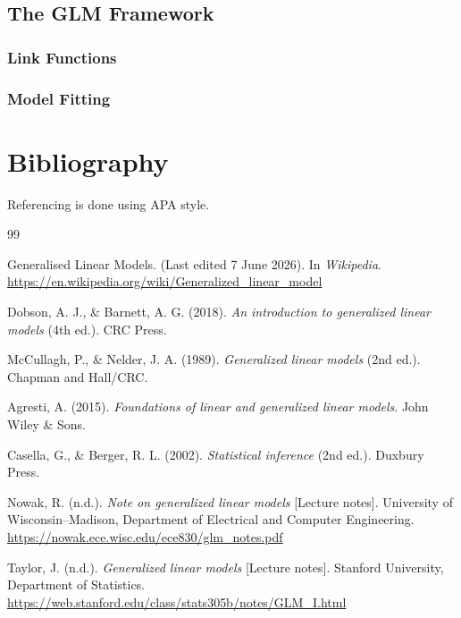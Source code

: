 \documentclass[12pt,a4paper]{report}
\begin{document}
\section{The GLM Framework}
\subsection{Link Functions}
\subsection{Model Fitting}

\chapter*{Bibliography}

Referencing is done using APA style.

\begin{thebibliography}{99}\setlength{\itemsep}{0.5em}

 Generalised Linear Models. (Last edited 7 June 2026). In \textit{Wikipedia}. \url{https://en.wikipedia.org/wiki/Generalized_linear_model}

 Dobson, A. J., \& Barnett, A. G. (2018). \textit{An introduction to generalized linear models} (4th ed.). CRC Press.

 McCullagh, P., \& Nelder, J. A. (1989). \textit{Generalized linear models} (2nd ed.). Chapman and Hall/CRC.

 Agresti, A. (2015). \textit{Foundations of linear and generalized linear models}. John Wiley \& Sons.

 Casella, G., \& Berger, R. L. (2002). \textit{Statistical inference} (2nd ed.). Duxbury Press.

 Nowak, R. (n.d.). \textit{Note on generalized linear models} [Lecture notes]. University of Wisconsin--Madison, Department of Electrical and Computer Engineering. \url{https://nowak.ece.wisc.edu/ece830/glm_notes.pdf}

 Taylor, J. (n.d.). \textit{Generalized linear models} [Lecture notes]. Stanford University, Department of Statistics. \url{https://web.stanford.edu/class/stats305b/notes/GLM_I.html}

\end{thebibliography}
\end{document}
